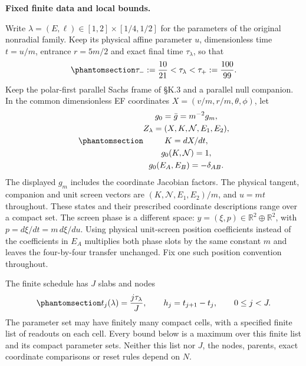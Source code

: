 \documentclass[
  english,
  11pt,
  reqno]{amsart}
\begin{document}
\protect{}\label{sec:fr-opt-c-setting}

\textbf{Fixed finite data and local bounds.}

Write \(\lambda=(E,\ell)\in[1,2]\times[1/4,1/2]\) for the parameters of
the original nonradial family. Keep its physical affine parameter \(u\),
dimensionless time \(t=u/m\), entrance \(r=5m/2\) and exact final time
\(\tau_\lambda\), so that
\begin{equation}\protect\phantomsection\label{eq:fr-opt-c-time-bounds}{
 \tau_-:=\frac{10}{21}<\tau_\lambda<\tau_+:=\frac{100}{99}.
}\end{equation} Keep the polar-first parallel Sachs frame of §K.3 and a
parallel null companion. In the common dimensionless EF coordinates
\(X=(v/m,r/m,\theta,\phi)\), let
\begin{equation}\protect\phantomsection\label{eq:fr-opt-c-dimensionless-convention}{\begin{gathered}
g_0=\bar g=m^{-2}g_m, \\
Z_\lambda=(X,K,\mathcal N,E_1,E_2), \\
K=dX/dt, \\
g_0(K,\mathcal N)=1, \\
g_0(E_A,E_B)=-\delta_{AB}.
\end{gathered}}\end{equation} The displayed \(g_m\) includes the coordinate Jacobian
factors. The physical tangent, companion and unit screen vectors are
\((K,\mathcal N,E_1,E_2)/m\), and \(u=mt\) throughout. These states and
their prescribed coordinate descriptions range over a compact set. The
screen phase is a different space:
\(y=(\xi,p)\in\mathbb R^2\oplus\mathbb R^2\), with
\(p=d\xi/dt=m\,d\xi/du\). Using physical unit-screen position
coefficients instead of the coefficients in \(E_A\) multiplies both
phase slots by the same constant \(m\) and leaves the four-by-four
transfer unchanged. Fix one such position convention throughout.

The finite schedule has \(J\) slabs and nodes
\begin{equation}\protect\phantomsection\label{eq:fr-opt-c-schedule}{
 t_j(\lambda)=\frac{j\tau_\lambda}{J},\qquad
 h_j=t_{j+1}-t_j,\qquad 0\le j<J.
}\end{equation} The parameter set may have finitely many compact cells,
with a specified finite list of readouts on each cell. Every bound below
is a maximum over this finite list and its compact parameter sets.
Neither this list nor \(J\), the nodes, parents, exact coordinate
comparisons or reset rules depend on \(N\).
\end{document}
